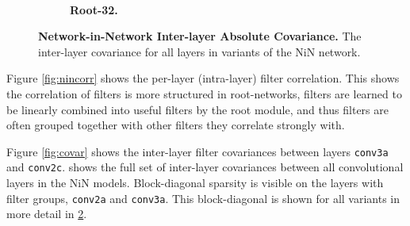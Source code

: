 \documentclass[thesis]{subfiles}
\begin{document}
{\begin{landscape}
\begin{figure}[p]
\begin{subfigure}[c]{\paperwidth}
					~
					\caption{\textbf{Root-32.}}
					\label{fig:covarroot32}
				\end{subfigure}
				\caption{\textbf{Network-in-Network Inter-layer Absolute Covariance.} The inter-layer covariance for all layers in variants of the NiN network.}
				\label{fig:suppcovariances}
			\end{figure}
		\end{landscape}
	}%
	
	Figure \ref{fig:nincorr} shows the per-layer (intra-layer) filter correlation. This shows the correlation of filters is more structured in root-networks, filters are learned to be linearly combined into useful filters by the root module, and thus filters are often grouped together with other filters they correlate strongly with.
	
	Figure \cref{fig:covar} shows the inter-layer filter covariances between layers \texttt{conv3a} and \texttt{conv2c}.  shows the full set of inter-layer covariances between all convolutional layers in the NiN models. Block-diagonal sparsity is visible on the layers with filter groups, \texttt{conv2a} and \texttt{conv3a}. This block-diagonal is shown for all variants in more detail in \cref{fig:suppcovariances}.
	
\end{document}
